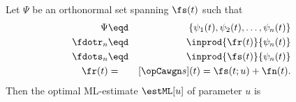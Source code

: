 \begin{theorem}
\label{thm:estML_general}
\label{thm:ml_est_det}
Let $\Psi$ be an orthonormal set spanning $\fs(t)$ such that
\begin{eqnarray*}
  \Psi     &\eqd& \{ \psi_1(t), \psi_2(t), \ldots, \psi_n(t)\} \\
  \fdotr_n &\eqd& \inprod{\fr(t)}{\psi_n(t)}                   \\
  \fdots_n &\eqd& \inprod{\fs(t)}{\psi_n(t)}                   \\
  \fr(t)     &=&    [\opCawgn s](t) = \fs(t;u) + \fn(t).
\end{eqnarray*}
Then the optimal ML-estimate $\estML[u]$ of parameter $ u $ is
\end{theorem}
